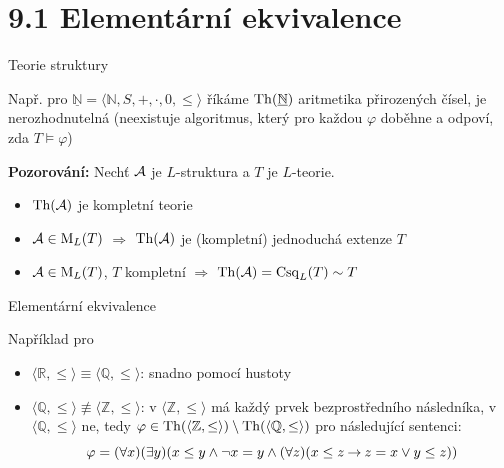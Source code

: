 \documentclass{beamer}
\begin{document}
\section{9.1 Elementární ekvivalence}


\begin{frame}{Teorie struktury}

    \pause

    \medskip

    \pause
    Např.  pro  $\underline{\mathbb{N}}=\langle\mathbb{N},S,+,\cdot,0,\le\rangle$ říkáme $\operatorname{Th}(\underline{\mathbb{N}})$ \alert{aritmetika přirozených čísel}, je \alert{nerozhodnutelná} (neexistuje algoritmus, který pro každou $\varphi$ doběhne a odpoví, zda $T\models\varphi$)

    \medskip

    \pause
    \textbf{Pozorování:} Nechť $\mathcal{A}$ je $L$-struktura a $T$ je $L$-teorie.\pause
    \begin{itemize}
        \item $\operatorname{Th}(\mathcal{A})$ je kompletní teorie\pause
        \item $\mathcal{A}\in\operatorname{M}_L(T)$ $\Rightarrow$ $\operatorname{Th}(\mathcal{A})$ je (kompletní) jednoduchá extenze $T$\pause
        \item $\mathcal{A}\in\operatorname{M}_L(T)$, $T$ kompletní $\Rightarrow$ $\operatorname{Th}(\mathcal{A})=\operatorname{Csq}_L(T)\sim T$
    \end{itemize}

\end{frame}


\begin{frame}{Elementární ekvivalence}
    
    \pause

    \bigskip

    \pause
    Například pro 
    \pause
    \begin{itemize}[<+->]
        \item  \alert{$\langle\mathbb R,\leq\rangle\equiv\langle\mathbb Q,\leq\rangle$}: \pause snadno pomocí \alert{hustoty} \pause
        \item \alert{$\langle\mathbb Q,\leq\rangle\not\equiv\langle\mathbb Z,\leq\rangle$}: \pause v $\langle\mathbb Z,\leq\rangle$ má každý prvek bezprostředního následníka, v $\langle\mathbb Q,\leq\rangle$ ne, tedy $\varphi\in\operatorname{Th}(\langle\mathbb Z,\leq\rangle)\setminus\operatorname{Th}(\langle\mathbb Q,\leq\rangle)$ pro následující sentenci:\pause
        $$
        \varphi=(\forall x)(\exists y)(x\leq y\land \neg x=y\land(\forall z)(x\leq z\mathbin{\rightarrow} z=x\lor y\leq z))
        $$        
    \end{itemize}

\end{frame}
\end{document}
